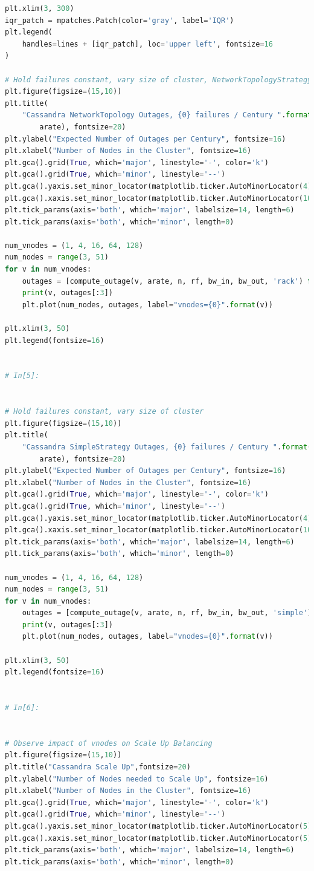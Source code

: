 \documentclass{article}
\begin{document}
\begin{lstlisting}[language=Python]
plt.xlim(3, 300)
iqr_patch = mpatches.Patch(color='gray', label='IQR')
plt.legend(
    handles=lines + [iqr_patch], loc='upper left', fontsize=16
)

# Hold failures constant, vary size of cluster, NetworkTopologyStrategy
plt.figure(figsize=(15,10))
plt.title(
    "Cassandra NetworkTopology Outages, {0} failures / Century ".format(
        arate), fontsize=20)
plt.ylabel("Expected Number of Outages per Century", fontsize=16)
plt.xlabel("Number of Nodes in the Cluster", fontsize=16)
plt.gca().grid(True, which='major', linestyle='-', color='k')
plt.gca().grid(True, which='minor', linestyle='--')
plt.gca().yaxis.set_minor_locator(matplotlib.ticker.AutoMinorLocator(4))
plt.gca().xaxis.set_minor_locator(matplotlib.ticker.AutoMinorLocator(10))
plt.tick_params(axis='both', which='major', labelsize=14, length=6)
plt.tick_params(axis='both', which='minor', length=0)

num_vnodes = (1, 4, 16, 64, 128)
num_nodes = range(3, 51)
for v in num_vnodes:
    outages = [compute_outage(v, arate, n, rf, bw_in, bw_out, 'rack') for n in num_nodes]
    print(v, outages[:3])
    plt.plot(num_nodes, outages, label="vnodes={0}".format(v))

plt.xlim(3, 50)
plt.legend(fontsize=16)


# In[5]:


# Hold failures constant, vary size of cluster
plt.figure(figsize=(15,10))
plt.title(
    "Cassandra SimpleStrategy Outages, {0} failures / Century ".format(
        arate), fontsize=20)
plt.ylabel("Expected Number of Outages per Century", fontsize=16)
plt.xlabel("Number of Nodes in the Cluster", fontsize=16)
plt.gca().grid(True, which='major', linestyle='-', color='k')
plt.gca().grid(True, which='minor', linestyle='--')
plt.gca().yaxis.set_minor_locator(matplotlib.ticker.AutoMinorLocator(4))
plt.gca().xaxis.set_minor_locator(matplotlib.ticker.AutoMinorLocator(10))
plt.tick_params(axis='both', which='major', labelsize=14, length=6)
plt.tick_params(axis='both', which='minor', length=0)

num_vnodes = (1, 4, 16, 64, 128)
num_nodes = range(3, 51)
for v in num_vnodes:
    outages = [compute_outage(v, arate, n, rf, bw_in, bw_out, 'simple') for n in num_nodes]
    print(v, outages[:3])
    plt.plot(num_nodes, outages, label="vnodes={0}".format(v))

plt.xlim(3, 50)
plt.legend(fontsize=16)


# In[6]:


# Observe impact of vnodes on Scale Up Balancing
plt.figure(figsize=(15,10))
plt.title("Cassandra Scale Up",fontsize=20)
plt.ylabel("Number of Nodes needed to Scale Up", fontsize=16)
plt.xlabel("Number of Nodes in the Cluster", fontsize=16)
plt.gca().grid(True, which='major', linestyle='-', color='k')
plt.gca().grid(True, which='minor', linestyle='--')
plt.gca().yaxis.set_minor_locator(matplotlib.ticker.AutoMinorLocator(5))
plt.gca().xaxis.set_minor_locator(matplotlib.ticker.AutoMinorLocator(5))
plt.tick_params(axis='both', which='major', labelsize=14, length=6)
plt.tick_params(axis='both', which='minor', length=0)


\end{lstlisting}
\end{document}
